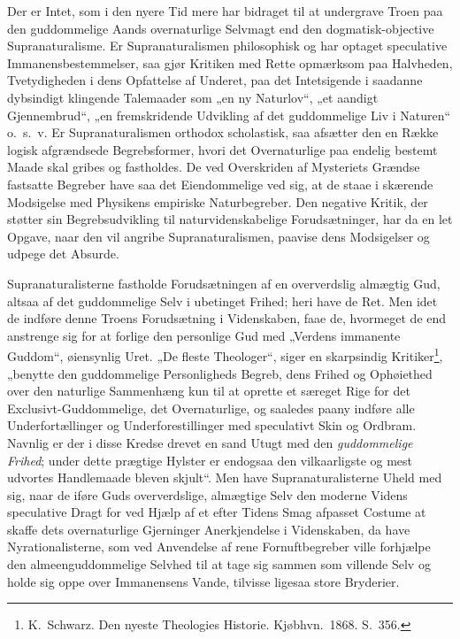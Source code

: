 \documentclass[12pt]{book}
\begin{document}
Der er Intet, som i den nyere Tid mere har bidraget til at undergrave
Troen paa den guddommelige Aands overnaturlige Selvmagt end den
dogmatisk-objective Supranaturalisme. Er Supranaturalismen
philosophisk og har optaget speculative Immanensbestemmelser, saa
gjør Kritiken med Rette opmærksom paa Halvheden, Tvetydigheden i
dens Opfattelse af Underet, paa det Intetsigende i saadanne
dybsindigt klingende Talemaader som „en ny Naturlov“, „et aandigt
Gjennembrud“, „en fremskridende Udvikling af det guddommelige Liv i
Naturen“ o.\ s.\ v. Er Supranaturalismen orthodox scholastisk, saa
afsætter den en Række logisk afgrændsede Begrebsformer, hvori det
Overnaturlige paa endelig bestemt Maade skal gribes og fastholdes.
De ved Overskriden af Mysteriets Grændse fastsatte Begreber have saa
det Eiendommelige ved sig, at de staae i skærende Modsigelse med
Physikens empiriske Naturbegreber. Den negative Kritik, der støtter
sin Begrebsudvikling til naturvidenskabelige Forudsætninger, har da
en let Opgave, naar den vil angribe
Supranaturalismen, paavise dens Modsigelser og udpege det Absurde.

Supranaturalisterne fastholde Forudsætningen af en oververdslig
almægtig Gud, altsaa af det guddommelige Selv i ubetinget Frihed;
heri have de Ret. Men idet de indføre denne Troens Forudsætning i
Videnskaben, faae de, hvormeget de end anstrenge sig for at forlige
den personlige Gud med „Verdens immanente Guddom“, øiensynlig Uret.
„De fleste Theologer“, siger en skarpsindig
Kritiker\footnote{K.\ Schwarz. Den nyeste Theologies Historie.
Kjøbhvn.\ 1868. S.\ 356.}, „benytte den guddommelige Personligheds
Begreb, dens Frihed og Ophøiethed over den naturlige Sammenhæng kun
til at oprette et særeget Rige for det Exclusivt-Guddommelige, det
Overnaturlige, og saaledes paany indføre alle Underfortællinger og
Underforestillinger med speculativt Skin og Ordbram. Navnlig er der
i disse Kredse drevet en sand Utugt med den \emph{guddommelige
Frihed}; under dette prægtige Hylster er endogsaa den vilkaarligste
og mest udvortes Handlemaade bleven skjult“. Men have
Supranaturalisterne Uheld med sig, naar de iføre Guds oververdslige,
almægtige Selv den moderne Videns speculative Dragt for ved Hjælp af
et efter Tidens Smag afpasset Costume at skaffe dets overnaturlige
Gjerninger Anerkjendelse i Videnskaben, da have Nyrationalisterne,
som ved Anvendelse af rene Fornuftbegreber ville forhjælpe den
almeenguddommelige Selvhed til at tage sig sammen som villende Selv
og holde sig oppe over Immanensens Vande, tilvisse ligesaa store
Bryderier.
\end{document}
